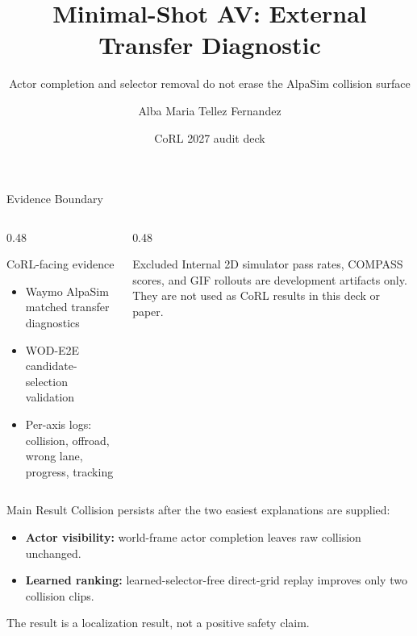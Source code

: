 \documentclass[aspectratio=169]{beamer}
\title{Minimal-Shot AV: External Transfer Diagnostic}
\subtitle{Actor completion and selector removal do not erase the AlpaSim collision surface}
\author{Alba Maria Tellez Fernandez}
\date{CoRL 2027 audit deck}
\begin{document}
\begin{frame}
  \titlepage
\end{frame}

\begin{frame}{Evidence Boundary}
  \begin{columns}[T]
    \begin{column}{0.48\textwidth}
      \begin{block}{CoRL-facing evidence}
        \begin{itemize}
          \item Waymo AlpaSim matched transfer diagnostics
          \item WOD-E2E candidate-selection validation
          \item Per-axis logs: collision, offroad, wrong lane, progress, tracking
        \end{itemize}
      \end{block}
    \end{column}
    \begin{column}{0.48\textwidth}
      \begin{alertblock}{Excluded}
        Internal 2D simulator pass rates, COMPASS scores, and GIF rollouts are development
        artifacts only. They are not used as CoRL results in this deck or paper.
      \end{alertblock}
    \end{column}
  \end{columns}
\end{frame}

\begin{frame}{Main Result}
  \Large
  Collision persists after the two easiest explanations are supplied:

  \vspace{0.7em}
  \begin{itemize}
    \item \textbf{Actor visibility:} world-frame actor completion leaves raw collision unchanged.
    \item \textbf{Learned ranking:} learned-selector-free direct-grid replay improves only two collision clips.
  \end{itemize}

  \vspace{0.7em}
  \normalsize
  The result is a localization result, not a positive safety claim.
\end{frame}
\end{document}
